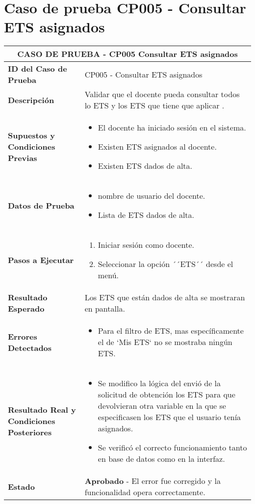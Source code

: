 \section{Caso de prueba CP005 - Consultar ETS asignados}

\begin{longtable}{|p{5cm}|p{10cm}|}
	\hline
	\multicolumn{2}{|c|}{\textbf{CASO DE PRUEBA - CP005 Consultar ETS asignados}} \\
	\hline
	\textbf{ID del Caso de Prueba} & CP005 - Consultar ETS asignados \\
	\hline
	\textbf{Descripción} & Validar que el docente pueda consultar todos lo ETS y los ETS que tiene que aplicar . \\
	\hline
	\textbf{Supuestos y Condiciones Previas} & 
	\begin{itemize}
		\item El docente ha iniciado sesión en el sistema.
		\item Existen ETS asignados al docente.
		\item Existen ETS dados de alta.
	\end{itemize} \\
	\hline
	\textbf{Datos de Prueba} & 
	\begin{itemize}
		\item nombre de usuario del docente.
		\item Lista de ETS dados de alta.
	\end{itemize} \\
	\hline
	\textbf{Pasos a Ejecutar} & 
	\begin{enumerate}
		\item Iniciar sesión como docente.
		\item Seleccionar la opción ´´ETS´´ desde el menú.
	\end{enumerate} \\
	\hline
	\textbf{Resultado Esperado} & 
	Los ETS que están dados de alta se mostraran en pantalla. \\
	\hline
	\textbf{Errores Detectados} & 
	\begin{itemize}
		\item Para el filtro de ETS, mas específicamente el de `Mis ETS` no se mostraba ningún ETS.

	\end{itemize} \\
	\hline
	\textbf{Resultado Real y Condiciones Posteriores} & 
	\begin{itemize}
		\item Se modifico la lógica del envió de la solicitud de obtención los ETS para que devolvieran otra variable en la que se especificasen los ETS que el usuario tenía asignados.
		\item Se verificó el correcto funcionamiento tanto en base de datos como en la interfaz.
	\end{itemize} \\
	\hline
	\textbf{Estado} & 
	\textbf{Aprobado} - El error fue corregido y la funcionalidad opera correctamente. \\
	\hline
\end{longtable}